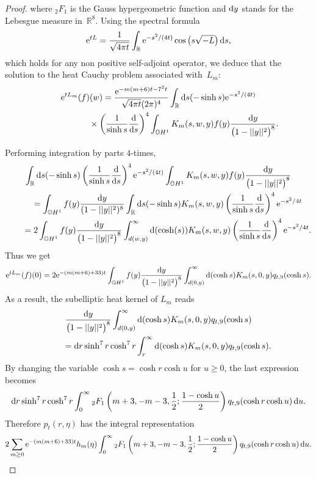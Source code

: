\documentclass[pdftex]{sigma}
\numberwithin{equation}{section}
\begin{document}
\begin{proof}
where $_2 F_{1}$ is the Gauss hypergeometric function and ${\rm d}y$ stands for the Lebesgue measure in~$\mathbb{R}^8$. Using the spectral formula
\begin{equation*}
{\rm e}^{tL}=\frac{1}{\sqrt{4\pi t}}\int_{\mathbb{R}}{\rm e}^{-s^2/(4t)}\cos\big(s\sqrt{-L}\big)\,{\rm d}s,
\end{equation*}
which holds for any non positive self-adjoint operator, we deduce that the solution to the heat Cauchy problem associated with~$L_m$:
\begin{gather*}
{\rm e}^{t L_m}(f)(w) =\frac{{\rm e}^{-m(m+6)t-7^2 t}}{\sqrt{4\pi t}(2\pi)^{4}}
\int_{\mathbb{R}} {\rm d}s (-\sinh s){\rm e}^{-s^2/(4t)}\\
\hphantom{{\rm e}^{t L_m}(f)(w) =}{}\times \left(\frac{1}{\sinh s}\frac{{\rm d}}{{\rm d}s}\right)^{4} \int_{\mathbb{O}H^1} K_m(s,w,y)f(y)\frac{{\rm d}y}{\big(1-||y||^2\big)^{8}}.
\end{gather*}

Performing integration by parts $4$-times,
\begin{gather*}
\int_{\mathbb{R}} {\rm d}s (-\sinh s)\left(\frac{1}{\sinh s}\frac{{\rm d}}{{\rm d}s}\right)^{4} {\rm e}^{-s^2/(4t)} \int_{\mathbb{O}H^1} K_m(s,w,y)f(y)\frac{{\rm d}y}{\big(1-||y||^2\big)^{8}}
\\
\qquad{}=\int_{\mathbb{O}H^1}f(y)\frac{{\rm d}y}{(1-||y||^2)^{8}} \int_{\mathbb{R}} {\rm d}s (-\sinh s)K_m(s,w,y)\left(\frac{1}{\sinh s }\frac{{\rm d}}{{\rm d}s}\right)^{4}{\rm e}^{-s^2/4t}
\\
\qquad{} =2\int_{\mathbb{O}H^1}f(y)\frac{{\rm d}y}{\big(1-||y||^2\big)^{8}} \int_{d(w,y)}^{\infty}{\rm d}(\cosh(s))K_m(s,w,y)\left(\frac{1}{\sinh s }\frac{{\rm d}}{{\rm d}s}\right)^{4}{\rm e}^{-s^2/4t}.
\end{gather*}
Thus we get
\begin{equation*}
{\rm e}^{tL_m}(f)(0)=2 {\rm e}^{-(m(m+6)+33)t}\int_{\mathbb{O}H^1} f(y)\frac{{\rm d}y}{\big(1-||y||^2\big)^{8}}\int_{d(0,y)}^{\infty}{\rm d}(\cosh s)K_m(s,0,y)q_{t,9}(\cosh s).
\end{equation*}
As a result, the subelliptic heat kernel of $L_m$ reads
\begin{gather*}
\frac{{\rm d}y}{\big(1-||y||^2\big)^{8}}\int_{d(0,y)}^{\infty}{\rm d}(\cosh s)K_m(s,0,y)q_{t,9}(\cosh s)
\\
\qquad{} ={\rm d}r \sinh^{7}r\cosh^7 r\int_{r}^{\infty}{\rm d}(\cosh s)K_m(s,0,y)q_{t,9}(\cosh s).
\end{gather*}
By changing the variable $\cosh s=\cosh r \cosh u$ for $u\geq 0$, the last expression becomes
\begin{equation*}
{\rm d}r \sinh^{7}r\cosh^7 r\int_{0}^{\infty} {_2} F_{1}\left(m+3,-m-3,\frac{1}{2};\frac{1-\cosh u }{2 }\right) q_{t,9}(\cosh r\cosh u)\,{\rm d}u.
\end{equation*}
Therefore $p_t(r,\eta)$ has the integral representation
\begin{equation*}
2\sum_{m\geq 0}{\rm e}^{-(m(m+6)+33)t}h_m(\eta) \int_{0}^{\infty} {_2} F_{1}\left(m+3,-m-3,\frac{1}{2};\frac{1-\cosh u }{2 }\right) q_{t,9}(\cosh r \cosh u)\,{\rm d}u.
\end{equation*}


\end{proof}
\end{document}
